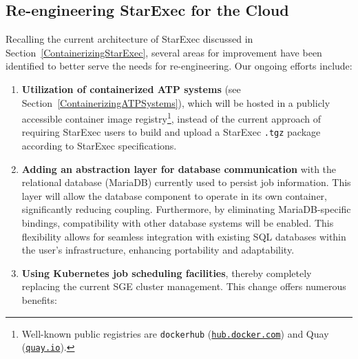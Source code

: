 \documentclass{easychair}
\newenvironment{packed_itemize}{
\vspace*{-0.3em}
\begin{itemize}
\setlength{\partopsep}{0pt}
\setlength{\itemsep}{1pt}
\setlength{\parskip}{0pt}
\setlength{\parsep}{0pt}
}{\end{itemize}}
\begin{document}
\subsection{Re-engineering StarExec for the Cloud}
\label{FutureStarExec}

Recalling the current architecture of StarExec discussed in Section~\ref{ContainerizingStarExec}, 
several areas for improvement have been identified to better serve the needs for re-engineering. 
Our ongoing efforts include:

\begin{enumerate}
\item \textbf{Utilization of containerized ATP systems} (see 
      Section~\ref{ContainerizingATPSystems}), which will be hosted in a publicly accessible 
      container image registry\footnote{%
      Well-known public registries are {\tt dockerhub} 
      (\href{https://hub.docker.com/}{\tt hub.docker.com}) and Quay 
      (\href{https://quay.io/}{\tt quay.io}).},
      instead of the current approach of requiring StarExec users to build and upload a 
      StarExec {\tt .tgz} package according to StarExec specifications.
\item \textbf{Adding an abstraction layer for database communication} with the relational 
      database (MariaDB) currently used to persist job information.  
      This layer will allow the database component to operate in its own container, significantly 
      reducing coupling. 
      Furthermore, by eliminating MariaDB-specific bindings, compatibility with other database 
      systems will be enabled. 
      This flexibility allows for seamless integration with existing SQL databases within the 
      user's infrastructure, enhancing portability and adaptability.
\item \textbf{Using Kubernetes job scheduling facilities}, thereby completely replacing the 
      current SGE cluster management.
      This change offers numerous benefits: 
\end{enumerate}
\end{document}

